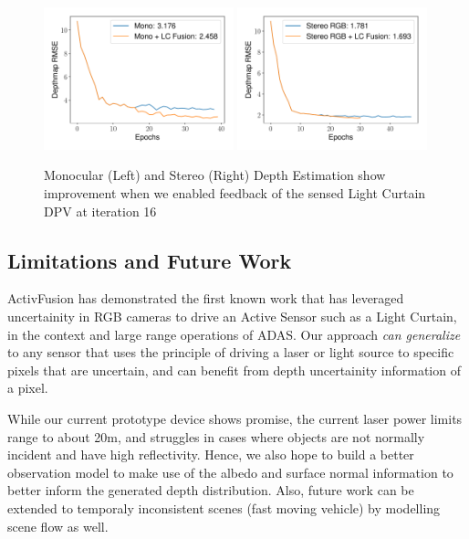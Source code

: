 \begin{figure}[h]
   \centering
   \begin{minipage}{0.5\textwidth}
       \centering
       \includegraphics[width=0.49\textwidth]{figures/Figure_10.pdf}
       \includegraphics[width=0.49\textwidth]{figures/Figure_11.pdf}
   \end{minipage}\hfill
   \centering
   \caption{Monocular (Left) and Stereo (Right) Depth Estimation show improvement when we enabled feedback of the sensed Light Curtain DPV at iteration 16}
   \label{fig:lfusion} 
\end{figure}

\subsection{Limitations and Future Work}

ActivFusion has demonstrated the first known work that has leveraged uncertainity in RGB cameras to drive an Active Sensor such as a Light Curtain, in the context and large range operations of ADAS. Our approach \textit{can generalize} to any sensor that uses the principle of driving a laser or light source to specific pixels that are uncertain, and can benefit from depth uncertainity information of a pixel. 

While our current prototype device shows promise, the current laser power limits range to about 20m, and struggles in cases where objects are not normally incident and have high reflectivity. Hence, we also hope to build a better observation model to make use of the albedo and surface normal information to better inform the generated depth distribution. Also, future work can be extended to temporaly inconsistent scenes (fast moving vehicle) by modelling scene flow as well.

